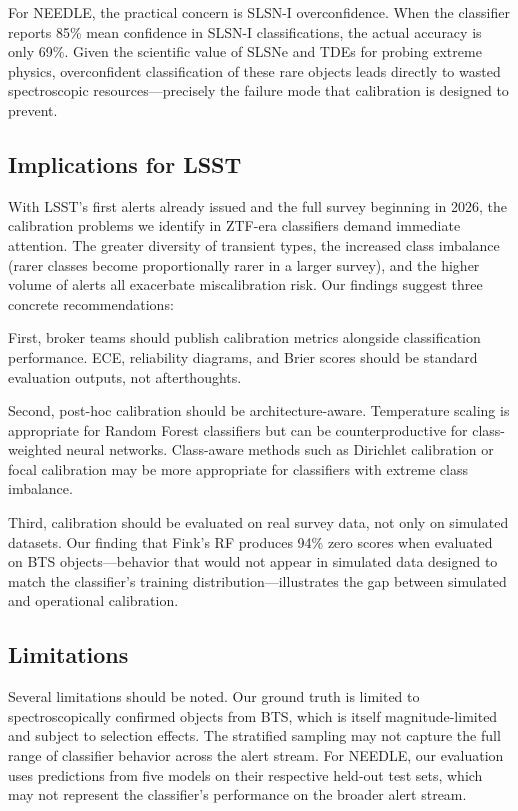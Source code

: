 \documentclass[twocolumn]{aastex631}
\begin{document}
For NEEDLE, the practical concern is SLSN-I overconfidence. When the classifier reports 85\% mean confidence in SLSN-I classifications, the actual accuracy is only 69\%. Given the scientific value of SLSNe and TDEs for probing extreme physics, overconfident classification of these rare objects leads directly to wasted spectroscopic resources---precisely the failure mode that calibration is designed to prevent.

\subsection{Implications for LSST}

With LSST's first alerts already issued and the full survey beginning in 2026, the calibration problems we identify in ZTF-era classifiers demand immediate attention. The greater diversity of transient types, the increased class imbalance (rarer classes become proportionally rarer in a larger survey), and the higher volume of alerts all exacerbate miscalibration risk. Our findings suggest three concrete recommendations:

First, broker teams should publish calibration metrics alongside classification performance. ECE, reliability diagrams, and Brier scores should be standard evaluation outputs, not afterthoughts.

Second, post-hoc calibration should be architecture-aware. Temperature scaling is appropriate for Random Forest classifiers but can be counterproductive for class-weighted neural networks. Class-aware methods such as Dirichlet calibration \citep{kull2019} or focal calibration \citep{mukhoti2020} may be more appropriate for classifiers with extreme class imbalance.

Third, calibration should be evaluated on real survey data, not only on simulated datasets. Our finding that Fink's RF produces 94\% zero scores when evaluated on BTS objects---behavior that would not appear in simulated data designed to match the classifier's training distribution---illustrates the gap between simulated and operational calibration.

\subsection{Limitations}

Several limitations should be noted. Our ground truth is limited to spectroscopically confirmed objects from BTS, which is itself magnitude-limited and subject to selection effects. The stratified sampling may not capture the full range of classifier behavior across the alert stream. For NEEDLE, our evaluation uses predictions from five models on their respective held-out test sets, which may not represent the classifier's performance on the broader alert stream.
\end{document}
